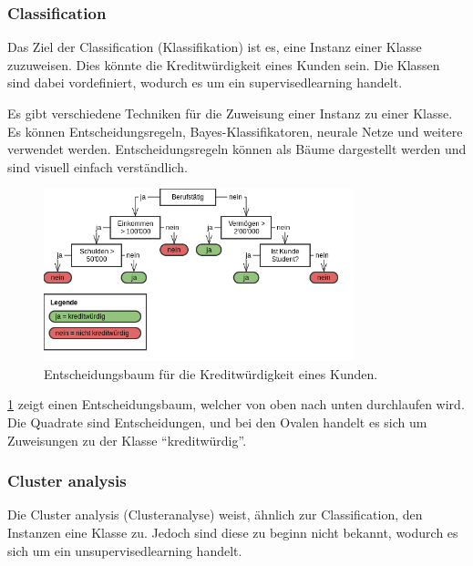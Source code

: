 \subsubsection{Classification}
\label{sec:recherche:dataminingtechniken:disziplinen:classification}
Das Ziel der Classification (Klassifikation) ist es, eine Instanz einer Klasse zuzuweisen. Dies könnte die Kreditwürdigkeit eines Kunden sein. Die Klassen sind dabei vordefiniert, wodurch es um ein \gls{supervisedlearning} handelt.

Es gibt verschiedene Techniken für die Zuweisung einer Instanz zu einer Klasse. Es können Entscheidungsregeln, Bayes-Klassifikatoren, neurale Netze und weitere verwendet werden. Entscheidungsregeln können als Bäume dargestellt werden und sind visuell einfach verständlich.

\begin{figure}[H]
	\centering
	\includegraphics[width=0.8\textwidth]{images/decision_tree.png}
	\caption{Entscheidungsbaum für die Kreditwürdigkeit eines Kunden.}
	\label{fig:recherche:dataminingtechniken:disziplinen:classification}
\end{figure}

\cref{fig:recherche:dataminingtechniken:disziplinen:classification} zeigt einen Entscheidungsbaum, welcher von oben nach unten durchlaufen wird. Die Quadrate sind Entscheidungen, und bei den Ovalen handelt es sich um Zuweisungen zu der Klasse "`kreditwürdig"'.



\subsubsection{Cluster analysis}
\label{sec:recherche:dataminingtechniken:disziplinen:clusteranalysis}
Die Cluster analysis (Clusteranalyse) weist, ähnlich zur Classification, den Instanzen eine Klasse zu. Jedoch sind diese zu beginn nicht bekannt, wodurch es sich um ein \gls{unsupervisedlearning} handelt.

